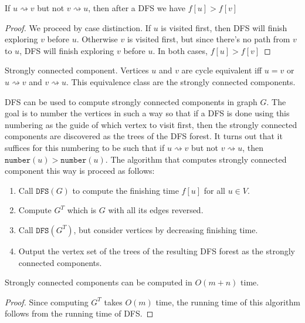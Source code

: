 \begin{lemma}
  If $u\rightsquigarrow v$ but not $v\rightsquigarrow u$, then after a DFS we have $f[u]>f[v]$
\end{lemma}
\begin{proof}
  We proceed by case distinction.  If $u$ is visited first, then DFS will
  finish exploring $v$ before $u$.  Otherwise $v$ is visited first, but since
  there's no path from $v$ to $u$, DFS will finish exploring $v$ before $u$.
  In both cases, $f[u]>f[v]$
\end{proof}

\begin{definition}{Strongly connected component.}
  Vertices $u$ and $v$ are cycle equivalent iff $u=v$ or $u\rightsquigarrow v$
  and $v\rightsquigarrow u$.  This equivalence class are the strongly connected
  components.
\end{definition}

DFS can be used to compute strongly connected components in graph $G$.  The
goal is to number the vertices in such a way so that if a DFS is done using
this numbering as the guide of which vertex to visit first, then the strongly
connected components are discovered as the trees of the DFS forest.  It turns
out that it suffices for this numbering to be such that if $u\rightsquigarrow
v$ but not $v\rightsquigarrow u$, then $\texttt{number}(u)>\texttt{number}(u)$.
The algorithm that computes strongly connected component this way is proceed as
follows:
\begin{enumerate}
  \item Call $\texttt{DFS}(G)$ to compute the finishing time $f[u]$ for all
    $u\in V$.
  \item Compute $G^T$ which is $G$ with all its edges reversed.
  \item Call $\texttt{DFS}(G^T)$, but consider vertices by decreasing finishing
    time.
  \item Output the vertex set of the trees of the resulting DFS forest as the
    strongly connected components.
\end{enumerate}

\begin{theorem}
  Strongly connected components can be computed in $O(m+n)$ time.
\end{theorem}
\begin{proof}
  Since computing $G^T$ takes $O(m)$ time, the running time of this algorithm
  follows from the running time of DFS.
\end{proof}

